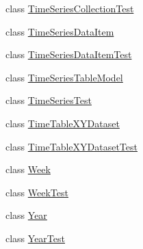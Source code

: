 \begin{DoxyCompactItemize}
\item 
class \mbox{\hyperlink{classorg_1_1jfree_1_1data_1_1time_1_1_time_series_collection_test}{Time\+Series\+Collection\+Test}}
\item 
class \mbox{\hyperlink{classorg_1_1jfree_1_1data_1_1time_1_1_time_series_data_item}{Time\+Series\+Data\+Item}}
\item 
class \mbox{\hyperlink{classorg_1_1jfree_1_1data_1_1time_1_1_time_series_data_item_test}{Time\+Series\+Data\+Item\+Test}}
\item 
class \mbox{\hyperlink{classorg_1_1jfree_1_1data_1_1time_1_1_time_series_table_model}{Time\+Series\+Table\+Model}}
\item 
class \mbox{\hyperlink{classorg_1_1jfree_1_1data_1_1time_1_1_time_series_test}{Time\+Series\+Test}}
\item 
class \mbox{\hyperlink{classorg_1_1jfree_1_1data_1_1time_1_1_time_table_x_y_dataset}{Time\+Table\+X\+Y\+Dataset}}
\item 
class \mbox{\hyperlink{classorg_1_1jfree_1_1data_1_1time_1_1_time_table_x_y_dataset_test}{Time\+Table\+X\+Y\+Dataset\+Test}}
\item 
class \mbox{\hyperlink{classorg_1_1jfree_1_1data_1_1time_1_1_week}{Week}}
\item 
class \mbox{\hyperlink{classorg_1_1jfree_1_1data_1_1time_1_1_week_test}{Week\+Test}}
\item 
class \mbox{\hyperlink{classorg_1_1jfree_1_1data_1_1time_1_1_year}{Year}}
\item 
class \mbox{\hyperlink{classorg_1_1jfree_1_1data_1_1time_1_1_year_test}{Year\+Test}}
\end{DoxyCompactItemize}
